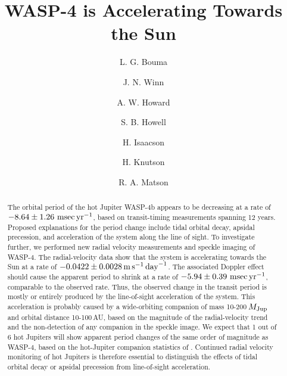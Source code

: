 \documentclass[12pt,twocolumn,tighten]{aastex62}
\begin{document}

\title{WASP-4 is Accelerating Towards the Sun}


%
%
\author[0000-0002-0514-5538]{L. G. Bouma}
%
\author[0000-0002-4265-047X]{J. N. Winn}

%
%
\author[0000-0001-8638-0320]{A. W. Howard}
%
\author{S. B. Howell}
%
\author[0000-0002-0531-1073]{H. Isaacson}
%
\author{H. Knutson}
%
\author{R. A. Matson}
%

\begin{abstract}
  The orbital period of the hot Jupiter WASP-4b appears to be
  decreasing at a rate of $-8.64 \pm 1.26~{\rm msec}\,{\rm yr}^{-1}$,
  based on transit-timing measurements spanning 12 years.  Proposed
  explanations for the period change include tidal orbital decay,
  apsidal precession, and acceleration of the system along the line of
  sight.  To investigate further, we performed new radial velocity
  measurements and speckle imaging of WASP-4.  The radial-velocity
  data show that the system is accelerating towards the Sun at a rate
  of $-0.0422\pm 0.0028\,{\rm m}\,{\rm s}^{-1}\,{\rm day}^{-1}$.  The
  associated Doppler effect should cause the apparent period to shrink
  at a rate of $-5.94 \pm 0.39~{\rm msec}\,{\rm yr}^{-1}$, comparable
  to the observed rate.  Thus, the observed change in the transit
  period is mostly or entirely produced by the line-of-sight
  acceleration of the system.  This acceleration is probably caused by
  a wide-orbiting companion of mass 10-200$\,M_{\rm Jup}$ and orbital
  distance 10-100$\,$AU, based on the magnitude of the radial-velocity
  trend and the non-detection of any companion in the speckle image.
  We expect that 1 out of 6 hot Jupiters will show apparent period
  changes of the same order of magnitude as WASP-4, based on the
  hot-Jupiter companion statistics of  \citet{knutson_friends_2014}.
  Continued radial velocity monitoring of hot Jupiters is therefore
  essential to distinguish the effects of tidal orbital decay or
  apsidal precession from line-of-sight acceleration.
\end{abstract}
\end{document}
